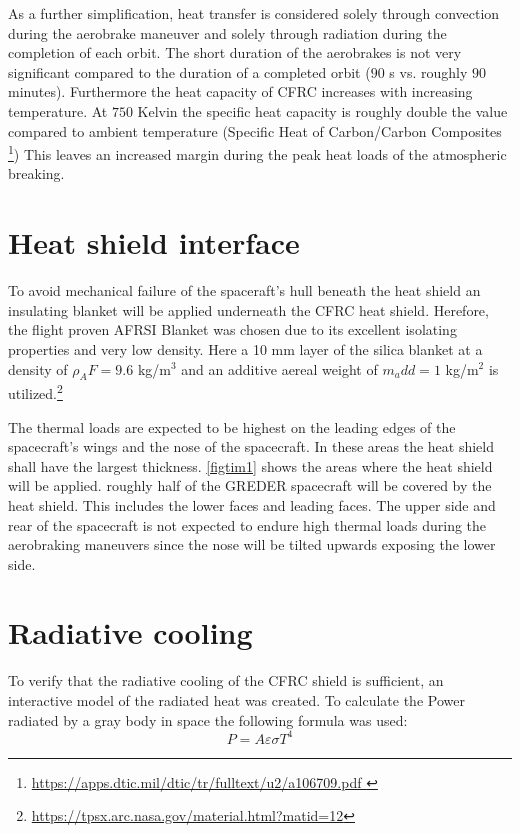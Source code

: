 As a further simplification, heat transfer is considered solely through convection during the aerobrake maneuver and solely through radiation during the completion of each orbit. The short duration of the aerobrakes is not very significant compared to the duration of a completed orbit ($90$ s vs. roughly $90$ minutes). Furthermore the heat capacity of CFRC increases with increasing temperature. At $750$ Kelvin the specific heat capacity is roughly double the value compared to ambient temperature (Specific Heat of Carbon/Carbon Composites \footnote{\url{https://apps.dtic.mil/dtic/tr/fulltext/u2/a106709.pdf }}) This leaves an increased margin during the peak heat loads of the atmospheric breaking.

\section{Heat shield interface}

\qquad To avoid mechanical failure of the spaceraft's hull beneath the heat shield an insulating blanket will be applied underneath the CFRC heat shield. Herefore, the flight proven AFRSI Blanket was chosen due
to its excellent isolating properties and very low density. Here a 10 mm layer of the silica blanket at a density of $\rho_AF = 9.6$ kg/m$^3$ and an additive aereal weight of $m_add = 1$ kg/m$^2$ is utilized.\footnote{\url{https://tpsx.arc.nasa.gov/material.html?matid=12}}

The thermal loads are expected to be highest on the leading edges of the spacecraft's wings and the nose of the spacecraft. In these areas the heat shield shall have the largest thickness. \autoref{figtim1} shows the areas where the heat shield will be applied. roughly half of the GREDER spacecraft will be covered by the heat shield. This includes the lower faces and leading faces. The upper side and rear of the spacecraft is not expected to endure high thermal loads during the aerobraking maneuvers since the nose will be tilted upwards exposing the lower side.

\section{Radiative cooling}
\qquad To verify that the radiative cooling of the CFRC shield is sufficient, an interactive model of the radiated heat was created. To calculate the Power radiated by a gray body in space the following formula was used:
\begin{equation}
	P  = A\varepsilon\sigma T^4
\end{equation}

